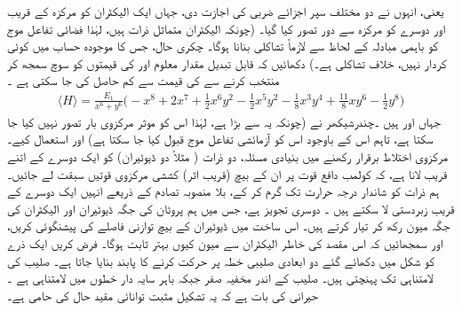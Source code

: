 یعنی،  انہوں نے دو مختلف سپر اجزائے ضربی کی اجازت دی، جہاں  ایک الیکٹران کو مرکزہ کے قریب اور دوسرے کو مرکزہ سے دور تصور کیا گیا۔ (چونکہ الیکٹران متماثل ذرات ہیں،  لہٰذا  فضائی تفاعل موج کو باہمی مبادلہ کے لحاظ سے لازماً تشاکلی بنانا ہوگا۔ چکری حال،  جس کا موجودہ حساب میں کوئی کردار نہیں، خلاف تشاکلی ہے۔) دکھائیں کہ قابل تبدیل مقدار معلوم  اور  کی قیمتوں کو سوچ سمجھ  کر منتخب کرنے سے  کی قیمت  سے کم حاصل کی جا سکتی ہے ۔ 
\begin{align*}
\langle H \rangle = \frac{E_{1}}{x^{6}+y^{6}}\big(-x^{8}+2x^{7}+\frac{1}{2}x^{6}y^{2}-\frac{1}{2}x^{5}y^{2}-\frac{1}{8}x^{3}y^{4}+\frac{11}{8}xy^{6}-\frac{1}{2}y^{8}\big)
\end{align*}
 جہاں  اور  ہیں ۔چندرشیکھر   نے   (چونکہ یہ  سے بڑا ہے، لہٰذا اس کو موثر مرکزوی بار تصور نہیں کیا جا سکتا ہے،  تاہم اس کے باوجود اس کو آزمائشی  تفاعل موج قبول کیا جا سکتا ہے)   اور  استعمال کیے۔
مرکزوی  اختلاط    برقرار رکھنے میں بنیادی مسئلہ،  دو ذرات ( مثلاً دو ڈیوٹیران)  کو ایک دوسرے کے اتنے قریب لانا ہے،   کہ کولمب  دافع قوت  پر ان کے بیچ  (قریب اثر) کششی    مرکزوی  قوتیں سبقت لے جائیں۔ ہم ذرات کو شاندار درجہ حرارت تک گرم کر کے، بلا منصوبہ  تصادم  کے ذریعے انہیں ایک دوسرے کے قریب زبردستی لا سکتے  ہیں ۔ دوسری تجویز     ہے،  جس میں ہم  پروٹان  کی جگہ ڈیوٹیران اور الیکٹران کی جگہ میون رکھ کر     تیار کرتے ہیں۔ اس ساخت میں ڈیوٹیران کے بیچ توازنی فاصلے  کی پیشنگوئی   کریں،    اور  سمجھائیں   کہ اس مقصد کی خاطر  الیکٹران سے میون  کیوں بہتر ثابت ہوگا۔
 
  فرض کریں ایک ذرے کو  شکل  میں دکھائے گئے  دو ابعادی صلیبی  خطہ پر  حرکت کرنے کا پابند بنایا جاتا ہے۔ صلیب کی     لامتناہی تک پہنچتی  ہیں۔  صلیب کے اندر مخفیہ صفر   جبکہ  باہر سایہ دار خطوں میں لامتناہی ہے ۔ حیرانی کی بات ہے کہ یہ تشکیل مثبت توانائی مقید حال کی حامی ہے۔

